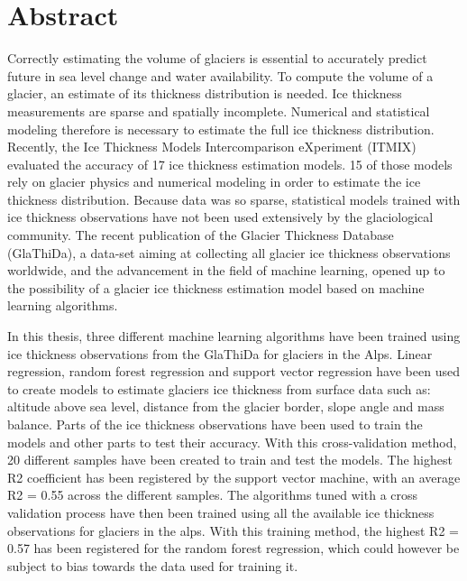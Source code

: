 \chapter*{Abstract}
\thispagestyle{plain}
Correctly estimating the volume of glaciers is essential to accurately predict future in sea level change and water availability. To compute the volume of a glacier, an estimate of its thickness distribution is needed. Ice thickness measurements are sparse and spatially incomplete. Numerical and statistical modeling therefore is necessary to estimate the full ice thickness distribution. Recently, the Ice Thickness Models Intercomparison eXperiment (ITMIX) evaluated the accuracy of 17 ice thickness estimation models. 15 of those models rely on glacier physics and numerical modeling in order to estimate the ice thickness distribution. Because data was so sparse, statistical models trained with ice thickness observations have not been used extensively by the glaciological community. The recent publication of the Glacier Thickness Database (GlaThiDa), a data-set aiming at collecting all glacier ice thickness observations worldwide, and the advancement in the field of machine learning, opened up to the possibility of a glacier ice thickness estimation model based on machine learning algorithms. 

In this thesis, three different machine learning algorithms have been trained using ice thickness observations from the GlaThiDa for glaciers in the Alps. Linear regression, random forest regression and support vector regression have been used to create models to estimate glaciers ice thickness from surface data such as: altitude above sea level, distance from the glacier border, slope angle and mass balance. Parts of the ice thickness observations have been used to train the models and other parts to test their accuracy. With this cross-validation method, 20 different samples have been created to train and test the models. The highest R2 coefficient has been registered by the support vector machine, with an average R2 = 0.55 across the different samples. The algorithms tuned with a cross validation process have then been trained using all the available ice thickness observations for glaciers in the alps. With this training method, the highest R2 = 0.57 has been registered for the random forest regression, which could however be subject to bias towards the data used for training it. 

